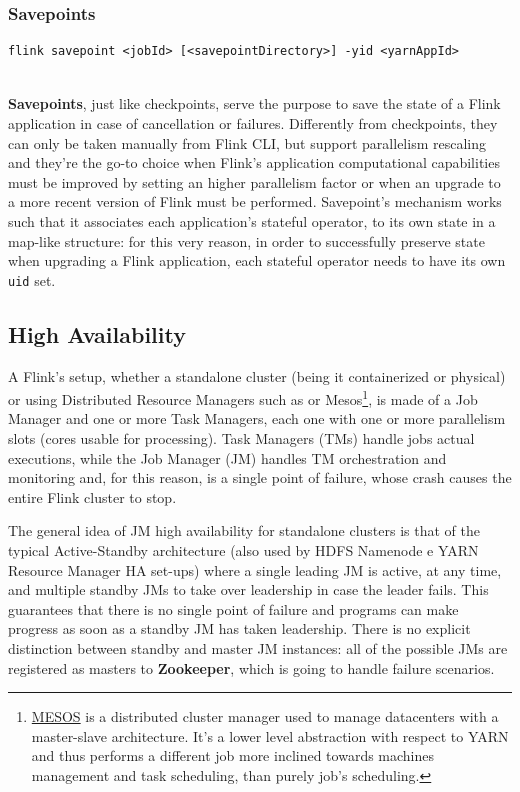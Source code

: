 \subsubsection{Savepoints}

\begin{code}
    \label{code:savepoint}
    \begin{verbatim}
flink savepoint <jobId> [<savepointDirectory>] -yid <yarnAppId> 
    \end{verbatim}
\end{code}~\\

\textbf{Savepoints}, just like checkpoints, serve the purpose to save the state of a Flink application in case of cancellation or failures. Differently from checkpoints, they can only be taken manually from Flink CLI, but support parallelism rescaling and they're the go-to choice when Flink's application computational capabilities must be improved by setting an higher parallelism factor or when an upgrade to a more recent version of Flink must be performed. Savepoint's mechanism works such that it associates each application's stateful operator, to its own state in a map-like structure: for this very reason, in order to successfully preserve state when upgrading a Flink application, each stateful operator needs to have its own \texttt{uid} set.

\subsection{High Availability}

A Flink's setup, whether a standalone cluster (being it containerized or physical) or using Distributed Resource Managers such as  or Mesos\footnote{\href{https://mesos.apache.org/}{MESOS} is a distributed cluster manager used to manage datacenters with a master-slave architecture. It's a lower level abstraction with respect to YARN and thus performs a different job more inclined towards machines management and task scheduling, than purely job's scheduling.}, is made of a Job Manager and one or more Task Managers, each one with one or more parallelism slots (cores usable for processing). Task Managers (TMs) handle jobs actual executions, while the Job Manager (JM) handles TM orchestration and monitoring and, for this reason, is a single point of failure, whose crash causes the entire Flink cluster to stop.

The general idea of JM high availability for standalone clusters is that of the typical Active-Standby architecture (also used by HDFS Namenode e YARN Resource Manager HA set-ups) where a single leading JM is active, at any time, and multiple standby JMs to take over leadership in case the leader fails. This guarantees that there is no single point of failure and programs can make progress as soon as a standby JM has taken leadership. There is no explicit distinction between standby and master JM instances: all of the possible JMs are registered as masters to \textbf{Zookeeper}, which is going to handle failure scenarios.

